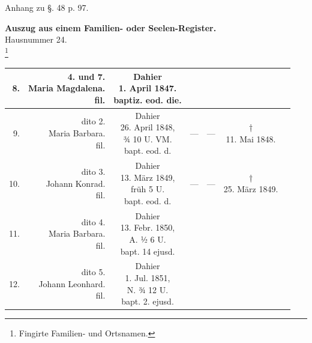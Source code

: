 \clearpage
{}
\begin{sideways}
\begin{minipage}{0.92\textheight}
\noindent Anhang zu §. 48 p. 97.
\begin{center}
{\large\bfseries Auszug aus einem Familien- oder Seelen-Register.}\\[0.8em]
Hausnummer 24.\\[0.3em]
{\large {}\footnote{Fingirte Familien- und Ortsnamen.}}\\[0.6em]
\footnotesize
\begin{tabular}{|r|r|c|c|c|c|p{3.6cm}|}
\hline
8. & \zl{4. und 7.\\ Maria Magdalena.\\ fil.} & \zl{Dahier\\ 1. April 1847.\\ baptiz. eod. die.} & & & & \\ \hline
9. & \zl{dito 2.\\ Maria Barbara.\\ fil.} & \zl{Dahier\\ 26. April 1848,\\ ¾ 10 U. VM.\\ bapt. eod. d.} & — & — & \zl{†\\ 11. Mai 1848.} & \\ \hline
10. & \zl{dito 3.\\ Johann Konrad.\\ fil.} & \zl{Dahier\\ 13. März 1849,\\ früh 5 U.\\ bapt. eod. d.} & — & — & \zl{†\\ 25. März 1849.} & \\ \hline
11. & \zl{dito 4.\\ Maria Barbara.\\ fil.} & \zl{Dahier\\ 13. Febr. 1850,\\ A. ½ 6 U.\\ bapt. 14 ejusd.} & & & & \\ \hline
12. & \zl{dito 5.\\ Johann Leonhard.\\ fil.} & \zl{Dahier\\ 1. Jul. 1851,\\ N. ¾ 12 U.\\ bapt. 2. ejusd.} & & & & \\ \hline
\end{tabular}
\end{center}
\end{minipage}
\end{sideways}

